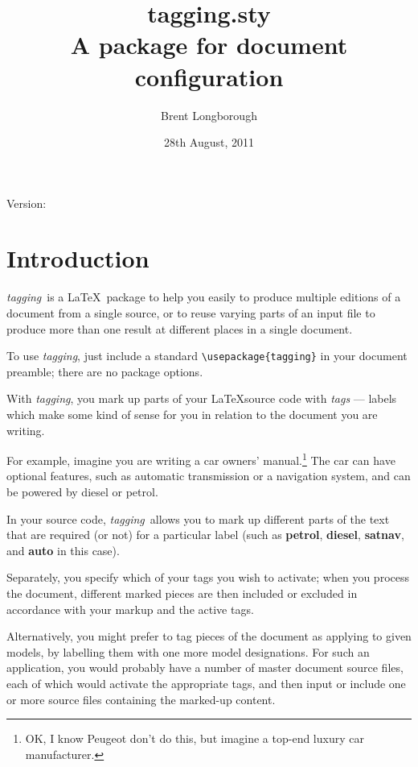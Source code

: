 \documentclass[a4paper,12pt,twoside,openany]{memoir}
\newcommand{\tpfname}{\textsf{tagging.sty}}
\newcommand{\tpname}{\textsf{\itshape tagging}}
\begin{document}
\title{%
	\Huge \tpfname\\[2ex]%
	\Large A package for document configuration
	}
\author{Brent Longborough}
\date{28th August, 2011}
\maketitle
{\centering
Version:\gitVtagn\\
}
\begingroup
{}
\setlength{\afterchapskip}{20pt}
\let\clearpage\relax
\let\chaptitlefont\Large\bfseries
\tableofcontents*
\clearpage
\endgroup
{}
\chapter{Introduction}
\tpname\ is a \LaTeX\ package to help you easily to
produce multiple editions of a document from a single source,
or to reuse varying parts of an input file
to produce more than one result at different places
in a single document.

To use \tpname, just include a standard \verb!\usepackage{tagging}!
in your document preamble; there are no package options.

With \tpname, you mark up parts of your
\LaTeX source code with \textit{tags} --- labels which
make some kind of sense for you in relation to
the document you are writing.

For example, imagine you are writing a car owners' manual.\footnote{%
OK, I know Peugeot don't do this,
but imagine a top-end luxury car manufacturer.}
The car can have optional features, such as automatic transmission
or a navigation system, and can be powered by diesel or petrol.

In your source code, \tpname\ allows you to
mark up different parts of the text that
are required (or not) for a particular label
(such as \textbf{petrol}, \textbf{diesel}, \textbf{satnav},
and \textbf{auto} in this case).

Separately, you specify which of your tags you wish to activate;
when you process the document, different marked pieces are then
included or excluded in accordance with your markup
and the active tags.

Alternatively, you might prefer to tag pieces of the document
as applying to given models, by labelling them with one more
model designations. 
For such an application, you would probably have
a number of master document source files,
each of which would activate the appropriate tags,
and then input or include one or more source files
containing the marked-up content.
\end{document}
